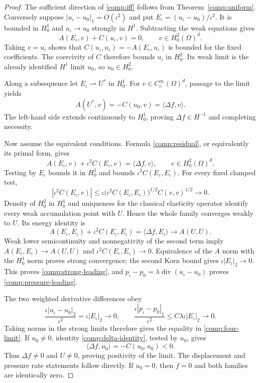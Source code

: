 \documentclass[11pt,a4paper]{article}
\theoremstyle{remark}
\numberwithin{equation}{section}
\begin{document}
\begin{proof}
The sufficient direction of \eqref{comp:iff} follows from
Theorem~\ref{comp:uniform}. Conversely suppose
$|u_\iota-u_0|_1=O(\iota^2)$ and put
$E_\iota=(u_\iota-u_0)/\iota^2$. It is bounded in $H^1_0$ and
$u_\iota\to u_0$ strongly in $H^1$. Subtracting the weak equations gives
\[
 A(E_\iota,v)+C(u_\iota,v)=0,\qquad v\in H^2_0(\Omega)^d.
\]
Taking $v=u_\iota$ shows that
$C(u_\iota,u_\iota)=-A(E_\iota,u_\iota)$ is bounded for the fixed
coefficients. The coercivity of $C$ therefore bounds $u_\iota$ in
$H^2_0$. Its weak limit is the already identified $H^1$ limit $u_0$, so
$u_0\in H^2_0$.

Along a subsequence let $E_\iota\rightharpoonup U^*$ in $H^1_0$. For
$v\in C_c^\infty(\Omega)^d$, passage to the limit yields
\[
 A(U^*,v)=-C(u_0,v)=\langle\Delta f,v\rangle.
\]
The left-hand side extends continuously to $H^1_0$, proving
$\Delta f\in H^{-1}$ and completing necessity.

Now assume the equivalent conditions. Formula \eqref{comp:residual}, or
equivalently its primal form, gives
\begin{equation}\label{comp:E-equation}
 A(E_\iota,v)+\iota^2C(E_\iota,v)
 =\langle\Delta f,v\rangle,
 \qquad v\in H^2_0(\Omega)^d.
\end{equation}
Testing by $E_\iota$ bounds it in $H^1_0$ and bounds
$\iota^2 C(E_\iota,E_\iota)$. For every fixed clamped test,
\[
 |\iota^2C(E_\iota,v)|
 \le\iota\bigl(\iota^2C(E_\iota,E_\iota)\bigr)^{1/2}
                     C(v,v)^{1/2}\longrightarrow0.
\]
Density of $H^2_0$ in $H^1_0$ and uniqueness for the classical elasticity
operator identify every weak accumulation point with $U$. Hence the whole
family converges weakly to $U$. Its energy identity is
\[
 A(E_\iota,E_\iota)+\iota^2C(E_\iota,E_\iota)
 =\langle\Delta f,E_\iota\rangle\longrightarrow A(U,U).
\]
Weak lower semicontinuity and nonnegativity of the second term imply
$A(E_\iota,E_\iota)\to A(U,U)$ and
$\iota^2C(E_\iota,E_\iota)\to0$. Equivalence of the $A$ norm with the
$H^1_0$ norm proves strong convergence; the second Korn bound gives
$\iota|E_\iota|_2\to0$. This proves \eqref{comp:strong-leading}, and
$p_\iota-p_0=\lambda\operatorname{div}(u_\iota-u_0)$ proves
\eqref{comp:pressure-leading}.

The two weighted derivative differences obey
\[
 \frac{\iota|u_\iota-u_0|_2}{\iota^2}
 =\iota|E_\iota|_2\longrightarrow0,
 \qquad
 \frac{\iota|p_\iota-p_0|_1}{\iota^2}
 \le C\lambda\iota|E_\iota|_2\longrightarrow0.
\]
Taking norms in the strong limits therefore gives the equality in
\eqref{comp:four-limit}. If $u_0\ne0$, identity
\eqref{comp:delta-identity}, tested by $u_0$, gives
\[
 \langle\Delta f,u_0\rangle=-C(u_0,u_0)<0.
\]
Thus $\Delta f\ne0$ and $U\ne0$, proving positivity of the limit.
The displacement and pressure rate statements follow directly. If $u_0=0$,
then $f=0$ and both families are identically zero.
\end{proof}
\end{document}
